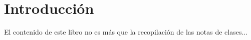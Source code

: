 \chapter*{Introducci\'on}

El contenido de este libro no es m\'as que la recopilaci\'on de las notas de clases... 





